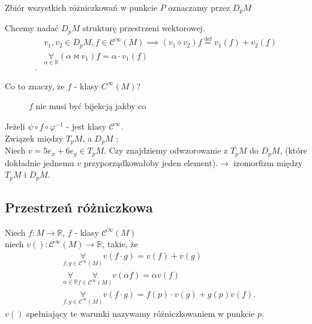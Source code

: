 \documentclass[../main.tex]{subfiles}
\begin{document}
    \begin{definicja}
        Zbiór wszystkich różniczkowań w punkcie $P$ oznaczamy przez $D_pM$
    \end{definicja}
    Chcemy nadać $D_pM$ strukturę przestrzeni wektorowej.
    \begin{align*}
        &v_1,v_2\in D_pM, f\in \mathcal{C}^{\infty}(M) \implies (v_1 \diamond v_2)f \overset{\text{def}}{=} v_1(f) + v_2(f)\\
        &\underset{\alpha\in\mathbb{R}}{\forall} (\alpha \bowtie v_1)f = \alpha \cdot v_1(f) \\
    .\end{align*}
    \begin{pytanie}
        Co to znaczy, że $f$ - klasy $C^{\infty}(M)$?
    \end{pytanie}
    \begin{figure}[h]
        \centering
        \caption{$f$ nie musi być bijekcją jakby co}
        \label{fig:fig_53}
    \end{figure}

    Jeżeli $\psi \circ f \circ \varphi^{-1}$ - jest klasy $\mathcal{C}^{\infty}$.\\
    Związek między $T_pM$, a $D_pM$ :\\
    Niech $v = 5e_x + 6e_y \in T_pM$. Czy znajdziemy odwzorowanie z  $T_pM$ do $D_pM$, (które dokładnie jednemu $v$ przyporządkowałoby jeden element).$\rightarrow$ izomorfizm między $T_pM$ i $D_pM$.


    \subsection{Przestrzeń różniczkowa}
    Niech $f: M\to \mathbb{R}$, $f$ - klasy $\mathcal{C}^{\infty}(M)$ \\
    niech $v\left(  \right) : \mathcal{C}^{\infty}(M)\to\mathbb{R}$, takie, że
    \begin{align*}
    &\underset{f,g\in\mathcal{C}^{\infty}\left( M \right) }{\forall}v(f\cdot g) = v(f) + v(g)\\
    &\underset{\alpha\in\mathbb{R}}{\forall} \underset{f\in\mathcal{C}^\infty(M)}{\forall} v(\alpha f) = \alpha v(f)\\
    & \underset{f,g\in\mathcal{C}^\infty (M)}{\forall} v(f\cdot g) = f(p) \cdot v(g) + g(p)v(f)
    .\end{align*}
    $v\left(  \right) $ spełniający te warunki nazywamy różniczkowaniem w punkcie $p$.
\end{document}
